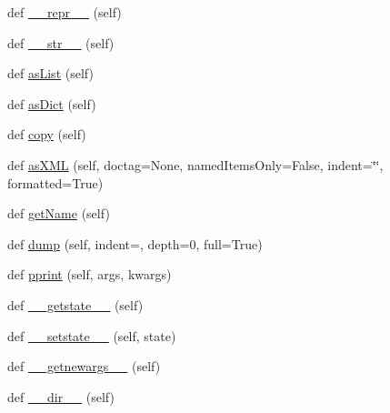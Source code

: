 \begin{DoxyCompactItemize}
\item 
def \hyperlink{classpkg__resources_1_1__vendor_1_1pyparsing_1_1ParseResults_acbaafdade7c01a5af7ee16b0d3e85b6d}{\+\_\+\+\_\+repr\+\_\+\+\_\+} (self)
\item 
def \hyperlink{classpkg__resources_1_1__vendor_1_1pyparsing_1_1ParseResults_a4a097cf222695437e65d56bd11c1bfb8}{\+\_\+\+\_\+str\+\_\+\+\_\+} (self)
\item 
def \hyperlink{classpkg__resources_1_1__vendor_1_1pyparsing_1_1ParseResults_aa7e886aa0826871511b189660343f3aa}{as\+List} (self)
\item 
def \hyperlink{classpkg__resources_1_1__vendor_1_1pyparsing_1_1ParseResults_ab73f26af9e7cc95de6dbb0d54d7a81ba}{as\+Dict} (self)
\item 
def \hyperlink{classpkg__resources_1_1__vendor_1_1pyparsing_1_1ParseResults_a2a61c21c96962723ec37cbbec5f3e583}{copy} (self)
\item 
def \hyperlink{classpkg__resources_1_1__vendor_1_1pyparsing_1_1ParseResults_a5a6a33bef33c1cd43437358783fdffde}{as\+X\+ML} (self, doctag=None, named\+Items\+Only=False, indent=\char`\"{}\char`\"{}, formatted=True)
\item 
def \hyperlink{classpkg__resources_1_1__vendor_1_1pyparsing_1_1ParseResults_a84fe6f0686f055144e26c2102c535689}{get\+Name} (self)
\item 
def \hyperlink{classpkg__resources_1_1__vendor_1_1pyparsing_1_1ParseResults_a8ef896f3757488f88d385652f96e7b1b}{dump} (self, indent=\textquotesingle{}\textquotesingle{}, depth=0, full=True)
\item 
def \hyperlink{classpkg__resources_1_1__vendor_1_1pyparsing_1_1ParseResults_a584f4c008b1c702a394e8295d878edda}{pprint} (self, args, kwargs)
\item 
def \hyperlink{classpkg__resources_1_1__vendor_1_1pyparsing_1_1ParseResults_a594ea435abd4fde98a1c858c51e5e48b}{\+\_\+\+\_\+getstate\+\_\+\+\_\+} (self)
\item 
def \hyperlink{classpkg__resources_1_1__vendor_1_1pyparsing_1_1ParseResults_a11faccdc68b6b5a93481319072b3eb9e}{\+\_\+\+\_\+setstate\+\_\+\+\_\+} (self, state)
\item 
def \hyperlink{classpkg__resources_1_1__vendor_1_1pyparsing_1_1ParseResults_a956d41c88a658b500cf12c0c1782e4bc}{\+\_\+\+\_\+getnewargs\+\_\+\+\_\+} (self)
\item 
def \hyperlink{classpkg__resources_1_1__vendor_1_1pyparsing_1_1ParseResults_acf4ab715aea2a0f33c0ecfb9d944aeee}{\+\_\+\+\_\+dir\+\_\+\+\_\+} (self)
\end{DoxyCompactItemize}
